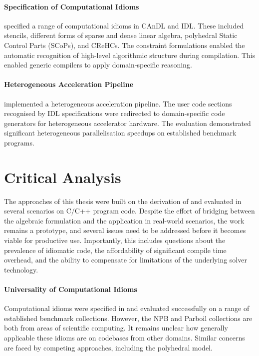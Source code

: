    \paragraph*{Specification of Computational Idioms}
     specified a range of
    computational idioms in CAnDL and IDL.
    These included stencils, different forms of sparse and dense linear algebra,
    polyhedral Static Control Parts (SCoPs), and CReHCs.
    The constraint formulations enabled the automatic recognition of high-level
    algorithmic structure during compilation.
    This enabled generic compilers to apply domain-specific reasoning.

\paragraph*{Heterogeneous Acceleration Pipeline}

     implemented a heterogeneous acceleration pipeline.
    The user code sections recognised by IDL specifications were redirected to
    domain-specific code generators for heterogeneous accelerator hardware.
    The evaluation demonstrated significant heterogeneous parallelisation
    speedups on established benchmark programs.

\section{Critical Analysis}

    The approaches of this thesis were built on the derivation of
     and evaluated in several scenarios on C/C++ program
    code.
    Despite the effort of bridging between the algebraic formulation and the
    application in real-world scenarios, the work remains a prototype, and
    several issues need to be addressed before it becomes viable for productive
    use.
    Importantly, this includes questions about the prevalence of idiomatic code,
    the affordability of significant compile time overhead, and the ability to
    compensate for limitations of the underlying solver technology.

\paragraph*{Universality of Computational Idioms}  

    Computational idioms were specified in
     and
    evaluated successfully on a range of established benchmark collections.
    However, the NPB and Parboil collections are both from areas of scientific
    computing.
    It remains unclear how generally applicable these idioms are on codebases
    from other domains.
    Similar concerns are faced by competing approaches, including the
    polyhedral model.

